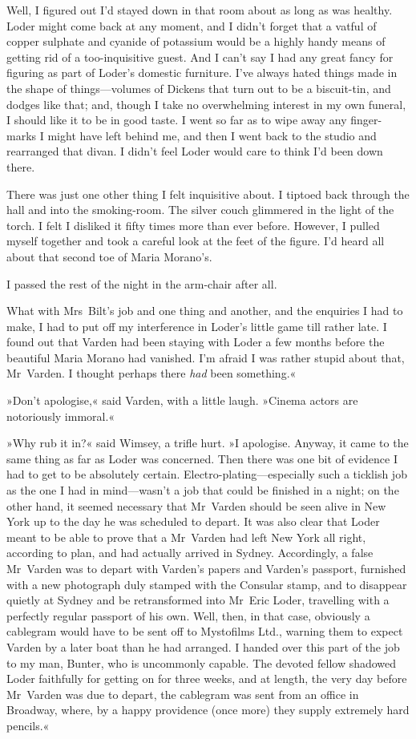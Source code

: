 Well, I figured out I'd stayed down in that room about as long as was healthy. Loder might come back at any moment, and I didn't forget that a vatful of copper sulphate and cyanide of potassium would be a highly handy means of getting rid of a too-inquisitive guest. And I can't say I had any great fancy for figuring as part of Loder's domestic furniture. I've always hated things made in the shape of things—volumes of Dickens that turn out to be a biscuit-tin, and dodges like that; and, though I take no overwhelming interest in my own funeral, I should like it to be in good taste. I went so far as to wipe away any finger-marks I might have left behind me, and then I went back to the studio and rearranged that divan. I didn't feel Loder would care to think I'd been down there.

There was just one other thing I felt inquisitive about. I tiptoed back through the hall and into the smoking-room. The silver couch glimmered in the light of the torch. I felt I disliked it fifty times more than ever before. However, I pulled myself together and took a careful look at the feet of the figure. I'd heard all about that second toe of Maria Morano's.

I passed the rest of the night in the arm-chair after all.

What with Mrs~Bilt's job and one thing and another, and the enquiries I had to make, I had to put off my interference in Loder's little game till rather late. I found out that Varden had been staying with Loder a few months before the beautiful Maria Morano had vanished. I'm afraid I was rather stupid about that, Mr~Varden. I thought perhaps there \textit{had} been something.«

»Don't apologise,« said Varden, with a little laugh. »Cinema actors are notoriously immoral.«

»Why rub it in?« said Wimsey, a trifle hurt. »I apologise. Anyway, it came to the same thing as far as Loder was concerned. Then there was one bit of evidence I had to get to be absolutely certain. Electro-plating—especially such a ticklish job as the one I had in mind—wasn't a job that could be finished in a night; on the other hand, it seemed necessary that Mr~Varden should be seen alive in New York up to the day he was scheduled to depart. It was also clear that Loder meant to be able to prove that a Mr~Varden had left New York all right, according to plan, and had actually arrived in Sydney. Accordingly, a false Mr~Varden was to depart with Varden's papers and Varden's passport, furnished with a new photograph duly stamped with the Consular stamp, and to disappear quietly at Sydney and be retransformed into Mr~Eric Loder, travelling with a perfectly regular passport of his own. Well, then, in that case, obviously a cablegram would have to be sent off to Mystofilms Ltd., warning them to expect Varden by a later boat than he had arranged. I handed over this part of the job to my man, Bunter, who is uncommonly capable. The devoted fellow shadowed Loder faithfully for getting on for three weeks, and at length, the very day before Mr~Varden was due to depart, the cablegram was sent from an office in Broadway, where, by a happy providence (once more) they supply extremely hard pencils.«


